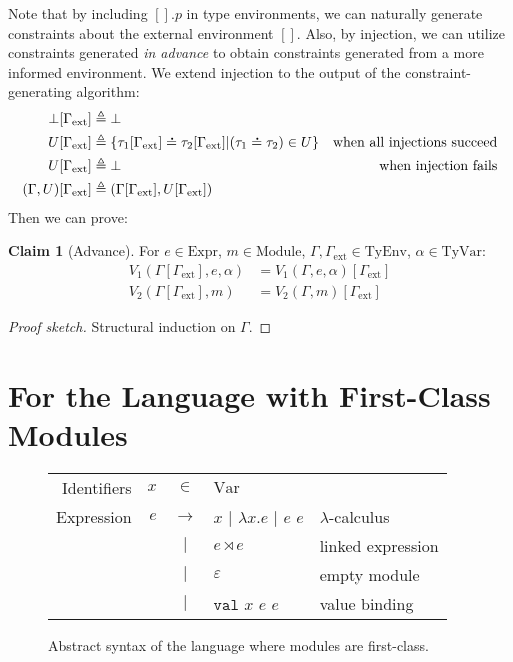 \documentclass{article}
\theoremstyle{definition}
\newtheorem{clm}{Claim}[section]
\newcommand*{\vbar}{|}
\newcommand*{\A}[1]{\overset{\,_{\mbox{\Large .}}}{#1}}
\newcommand*{\Expr}{\text{Expr}}
\newcommand*{\ExprVar}{\text{Var}}
\newcommand*{\Module}{\text{Module}}
\newcommand*{\link}[2]{{#1}\rtimes{#2}}
\newcommand*{\Lete}{\mathtt{val}}
\newcommand*{\TyEnv}{\text{TyEnv}}
\newcommand*{\TyVar}{\text{TyVar}}
\newcommand*{\external}{\Gamma_{\text{ext}}}
\begin{document}
Note that by including $[].p$ in type environments, we can naturally generate constraints about the external environment $[]$.
Also, by injection, we can utilize constraints generated \emph{in advance} to obtain constraints generated from a more informed environment.
We extend injection to the output of the constraint-generating algorithm:
\begin{align*}
  \bot[\external]       & \triangleq\bot                                                                                                      \\
  U[\external]          & \triangleq\{\tau_1[\external]\A{=}\tau_2[\external]|(\tau_1\A{=}\tau_2)\in U\} & \text{when all injections succeed} \\
  U[\external]          & \triangleq\bot                                                                 & \text{when injection fails}        \\
  (\Gamma,U)[\external] & \triangleq(\Gamma[\external],U[\external])
\end{align*}
Then we can prove:
\begin{clm}[Advance]
  For $e\in\Expr$, $m\in\Module$, $\Gamma,\external\in\TyEnv$, $\alpha\in\TyVar$:
  \begin{align*}
    V_1(\Gamma[\external],e,\alpha) & =V_1(\Gamma,e,\alpha)[\external] \\
    V_2(\Gamma[\external],m)        & =V_2(\Gamma,m)[\external]
  \end{align*}
\end{clm}
\begin{proof}[Proof sketch]
  Structural induction on $\Gamma$.
\end{proof}

\section{For the Language with First-Class Modules}
\begin{figure}[htb]
  \centering
  \begin{tabular}{rrcll}
    Identifiers & $x$ & $\in$         & $\ExprVar$                                                     \\
    Expression  & $e$ & $\rightarrow$ & $x$ $\vbar$ $\lambda x.e$ $\vbar$ $e$ $e$ & $\lambda$-calculus \\
                &     & $\vbar$       & $\link{e}{e}$                             & linked expression  \\
                &     & $\vbar$       & $\varepsilon$                             & empty module       \\
                &     & $\vbar$       & $\Lete$ $x$ $e$ $e$                       & value binding
  \end{tabular}
  \caption{Abstract syntax of the language where modules are first-class.}
  \label{fig:extsyntax}
\end{figure}
\end{document}
